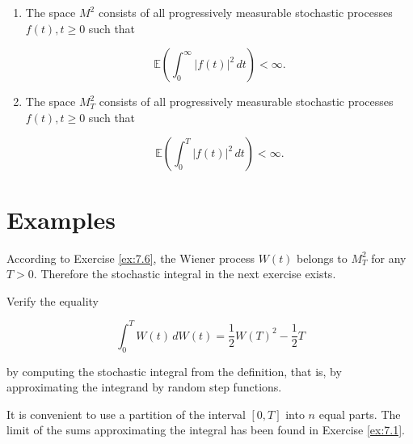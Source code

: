 \begin{Theorem}
\label{th:7.2}
\begin{enumerate}
\item The space $M^2$ consists of all progressively measurable stochastic processes $f(t), t \geq 0$ such that

\begin{equation}
\mathbb{E}\left(\int_0^\infty |f(t)|^2 \, dt\right) < \infty.
\end{equation}

\item The space $M_T^2$ consists of all progressively measurable stochastic processes $f(t), t \geq 0$ such that

\begin{equation}
\mathbb{E}\left(\int_0^T |f(t)|^2 \, dt\right) < \infty.
\end{equation}
\end{enumerate}
\end{Theorem}

\section{Examples}
\label{sec:ItoExamples}

According to Exercise \ref{ex:7.6}, the Wiener process $W(t)$ belongs to $M_T^2$ for any $T > 0$. Therefore the stochastic integral in the next exercise exists.

\begin{Exercise}
\label{ex:7.8}
Verify the equality

\begin{equation}
\int_0^T W(t) \, dW(t) = \frac{1}{2} W(T)^2 - \frac{1}{2} T
\end{equation}

by computing the stochastic integral from the definition, that is, by approximating the integrand by random step functions.

\begin{hint}
It is convenient to use a partition of the interval $[0, T]$ into $n$ equal parts. The limit of the sums approximating the integral has been found in Exercise \ref{ex:7.1}.
\end{hint}
\end{Exercise}

